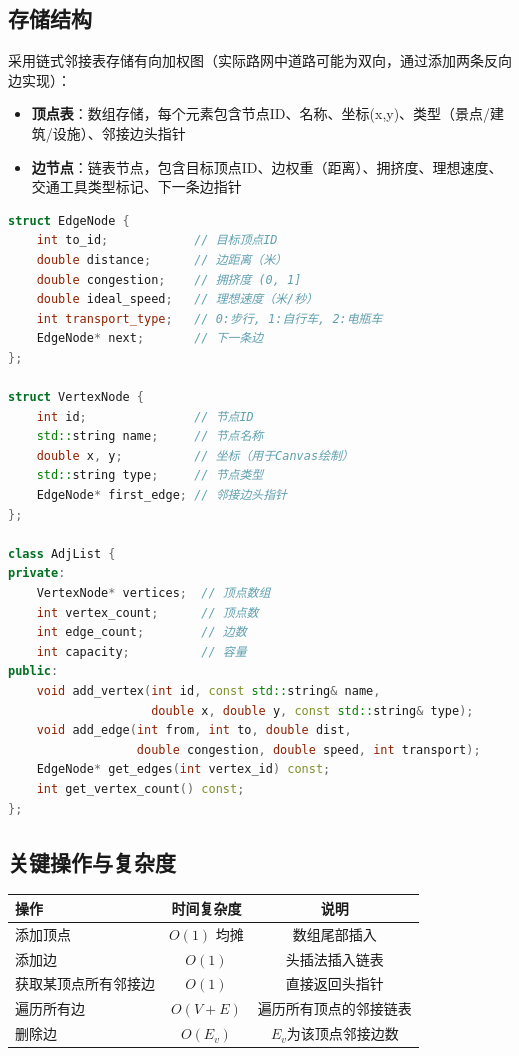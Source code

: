 \documentclass[12pt,a4paper]{report}
\begin{document}
\subsection{存储结构}

采用链式邻接表存储有向加权图（实际路网中道路可能为双向，通过添加两条反向边实现）：

\begin{itemize}
    \item \textbf{顶点表}：数组存储，每个元素包含节点ID、名称、坐标(x,y)、类型（景点/建筑/设施）、邻接边头指针
    \item \textbf{边节点}：链表节点，包含目标顶点ID、边权重（距离）、拥挤度、理想速度、交通工具类型标记、下一条边指针
\end{itemize}

\begin{lstlisting}[language=C++, caption={邻接表数据结构定义}]
struct EdgeNode {
    int to_id;            // 目标顶点ID
    double distance;      // 边距离（米）
    double congestion;    // 拥挤度 (0, 1]
    double ideal_speed;   // 理想速度（米/秒）
    int transport_type;   // 0:步行, 1:自行车, 2:电瓶车
    EdgeNode* next;       // 下一条边
};

struct VertexNode {
    int id;               // 节点ID
    std::string name;     // 节点名称
    double x, y;          // 坐标（用于Canvas绘制）
    std::string type;     // 节点类型
    EdgeNode* first_edge; // 邻接边头指针
};

class AdjList {
private:
    VertexNode* vertices;  // 顶点数组
    int vertex_count;      // 顶点数
    int edge_count;        // 边数
    int capacity;          // 容量
public:
    void add_vertex(int id, const std::string& name,
                    double x, double y, const std::string& type);
    void add_edge(int from, int to, double dist,
                  double congestion, double speed, int transport);
    EdgeNode* get_edges(int vertex_id) const;
    int get_vertex_count() const;
};
\end{lstlisting}

\subsection{关键操作与复杂度}

\begin{table}[H]
\centering
\begin{tabular}{lcc}
\toprule
\textbf{操作} & \textbf{时间复杂度} & \textbf{说明} \\
\midrule
添加顶点 & $O(1)$ 均摊 & 数组尾部插入 \\
添加边 & $O(1)$ & 头插法插入链表 \\
获取某顶点所有邻接边 & $O(1)$ & 直接返回头指针 \\
遍历所有边 & $O(V + E)$ & 遍历所有顶点的邻接链表 \\
删除边 & $O(E_v)$ & $E_v$为该顶点邻接边数 \\
\bottomrule
\end{tabular}
\end{table}
\end{document}
